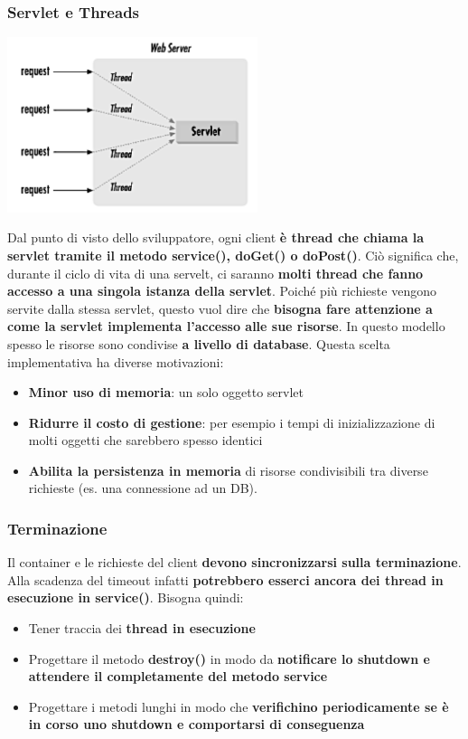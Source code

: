 \documentclass[12pt]{article}
\begin{document}
\subsubsection{Servlet e Threads}
\begin{center}
    \includegraphics[width = 0.55\textwidth]{Images/187.png}
\end{center}
Dal punto di visto dello sviluppatore, ogni client \textbf{è thread che chiama la servlet tramite il metodo service(), doGet() o doPost()}.
Ciò significa che, durante il ciclo di vita di una servelt, ci saranno \textbf{molti thread che fanno accesso a una singola istanza della servlet}.
Poiché più richieste vengono servite dalla stessa servlet, questo vuol dire che \textbf{bisogna fare attenzione a come la servlet implementa l'accesso alle sue risorse}.
In questo modello spesso le risorse sono condivise \textbf{a livello di database}. Questa scelta implementativa ha diverse motivazioni:
\begin{itemize}
    \item \textbf{Minor uso di memoria}: un solo oggetto servlet
    \item \textbf{Ridurre il costo di gestione}: per esempio i tempi di inizializzazione di molti oggetti che sarebbero spesso identici
    \item \textbf{Abilita la persistenza in memoria} di risorse condivisibili tra diverse richieste (es. una connessione ad un DB).
\end{itemize}
\subsubsection{Terminazione}
Il container e le richieste del client \textbf{devono sincronizzarsi sulla terminazione}. Alla scadenza del timeout infatti \textbf{potrebbero esserci ancora dei thread in esecuzione in service()}.
Bisogna quindi:
\begin{itemize}
    \item Tener traccia dei \textbf{thread in esecuzione}
    \item Progettare il metodo \textbf{destroy()} in modo da \textbf{notificare lo shutdown e attendere il completamente del metodo service}
    \item Progettare i metodi lunghi in modo che \textbf{verifichino periodicamente se è in corso uno shutdown e comportarsi di conseguenza}
\end{itemize}
\end{document}
